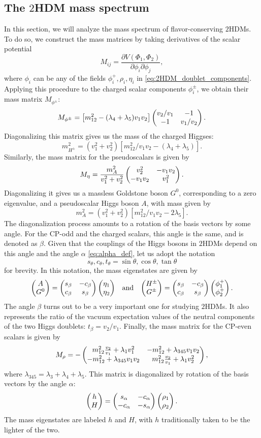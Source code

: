\subsection{The $2$HDM mass spectrum}

In this section, we will analyze the mass spectrum of flavor-conserving $2$HDMs. To do so, we construct the mass matrices by taking derivatives of the scalar potential
\[M_{ij} = \frac{\partial V(\Phi_1,\Phi_2)}{\partial\phi_i\partial\phi_j},\]
where $\phi_{i}$ can be any of the fields $\phi_i^+,\rho_i,\eta_i$ in \eqref{eq:2HDM_doublet_components}. 
Applying this procedure to the charged scalar components $\phi_i^\pm$, we obtain their mass matrix $M_{\phi^{\pm}}$:
\[M_{\phi^\pm} = \left[m_{12}^2-(\lambda_4+\lambda_5)v_1v_2\right]\begin{pmatrix} v_2/v_1 & -1 \\ -1 & v_1/v_2\end{pmatrix}.\]
Diagonalizing this matrix gives us the mass of the charged Higgses:
\[m_{H^\pm}^2 = (v_1^2+v_2^2)\left[m_{12}^2/v_1v_2-(\lambda_4+\lambda_5)\right].\]
Similarly, the mass matrix for the pseudoscalars is given by
\[M_{\eta} = \frac{m_A^2}{v_1^2+v_2^2}\begin{pmatrix} v_2^2 & -v_1v_2 \\ -v_1v_2 & v_1^2\end{pmatrix}.\]
Diagonalizing it gives us a massless Goldstone boson $G^0$, corresponding to a zero eigenvalue, and a pseudoscalar Higgs boson $A$, with mass given by
\[m_A^2 = (v_1^2+v_2^2)\left[m_{12}^2/v_1v_2-2\lambda_5\right].\]
The diagonalization process amounts to a rotation of the basis vectors by some angle. For the CP-odd and the charged scalars, this angle is the same, and is denoted as $\beta$. Given that the couplings of the Higgs bosons in $2$HDMs depend on this angle and the angle $\alpha$ \eqref{eq:alpha_def}, let us adopt the notation 
\[s_\theta,c_\theta,t_\theta = \sin\theta,\cos\theta,\tan\theta\]
for brevity. In this notation, the mass eigenstates are given by
\begin{align}
\begin{pmatrix} A \\ G^0\end{pmatrix} = \begin{pmatrix} s_\beta & -c_\beta \\ c_\beta & s_\beta\end{pmatrix}\begin{pmatrix} \eta_1 \\ \eta_2\end{pmatrix}&&\text{and}&&
\begin{pmatrix} H^\pm \\ G^\pm\end{pmatrix} = \begin{pmatrix} s_\beta & -c_\beta \\ c_\beta & s_\beta\end{pmatrix}\begin{pmatrix} \phi_1^+ \\ \phi_2^+\end{pmatrix}.
\end{align}
The angle $\beta$ turns out to be a very important one for studying $2$HDMs. It also represents the ratio of the vacuum expectation values of the neutral components of the two Higgs doublets: $t_\beta = v_2/v_1$.
Finally, the mass matrix for the CP-even scalars is given by
\[M_{\rho} = -\begin{pmatrix} m_{12}^2\frac{v_2}{v_1}+\lambda_1v_1^2 & -m_{12}^2+\lambda_{345}v_1v_2 \\ -m_{12}^2+\lambda_{345}v_1v_2 & m_{12}^2\frac{v_2}{v_1}+\lambda_1v_2^2\end{pmatrix},\]
where $\lambda_{345} = \lambda_3+\lambda_4+\lambda_5$. This matrix is diagonalized by rotation of the basis vectors by the angle $\alpha$:
\begin{equation}
\begin{pmatrix} h \\ H\end{pmatrix} = \begin{pmatrix} s_\alpha & -c_\alpha \\ -c_\alpha & -s_\alpha\end{pmatrix}\begin{pmatrix} \rho_1 \\ \rho_2\end{pmatrix}.
\label{eq:alpha_def}
\end{equation}
The mass eigenstates are labeled $h$ and $H$, with $h$ traditionally taken to be the lighter of the two.

